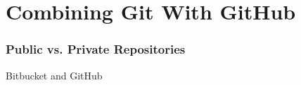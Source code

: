 
\section[GitHub]{Combining Git With GitHub}

\begin{frame}
\frametitle{Public vs. Private Repositories}
Bitbucket and GitHub
\end{frame}